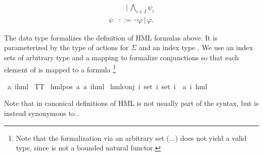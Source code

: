 \begin{isabellebody}
\begin{isamarkuptext}
\begin{align*}
            &\quad | \, \bigwedge_{i \in I} \psi_i \\
    \psi &::= \neg \varphi \, | \, \varphi.
\end{align*}%
\end{isamarkuptext}\isamarkuptrue%
%
\begin{isamarkuptext}%
The data type  formalizes the definition of HML formulas above. It is parameterized by the type of actions  for $\Sigma$
and an index type . We use an index sets of arbitrary type  and a mapping  to formalize
conjunctions so that each element of  is mapped to a formula%
\footnote{Note that the formalization via an arbitrary set (...) does not yield a valid type, since  is not a bounded natural functor.}%
\end{isamarkuptext}\isamarkuptrue%
\isamarkupfalse%
\ {\isacharparenleft}{\kern0pt}{\isacharprime}{\kern0pt}a{\isacharcomma}{\kern0pt}\ {\isacharprime}{\kern0pt}i{\isacharparenright}{\kern0pt}hml\ {\isacharequal}{\kern0pt}\isanewline
TT\ {\isacharbar}{\kern0pt}\isanewline
hml{\isacharunderscore}{\kern0pt}pos\ {\isacartoucheopen}{\isacharprime}{\kern0pt}a{\isacartoucheclose}\ {\isacartoucheopen}{\isacharparenleft}{\kern0pt}{\isacharprime}{\kern0pt}a{\isacharcomma}{\kern0pt}\ {\isacharprime}{\kern0pt}i{\isacharparenright}{\kern0pt}hml{\isacartoucheclose}\ {\isacharbar}{\kern0pt}\isanewline
hml{\isacharunderscore}{\kern0pt}conj\ {\isachardoublequoteopen}{\isacharprime}{\kern0pt}i\ set{\isachardoublequoteclose}\ {\isachardoublequoteopen}{\isacharprime}{\kern0pt}i\ set{\isachardoublequoteclose}\ {\isachardoublequoteopen}{\isacharprime}{\kern0pt}i\ {\isasymRightarrow}\ {\isacharparenleft}{\kern0pt}{\isacharprime}{\kern0pt}a{\isacharcomma}{\kern0pt}\ {\isacharprime}{\kern0pt}i{\isacharparenright}{\kern0pt}\ hml{\isachardoublequoteclose}%
\begin{isamarkuptext}%
Note that in canonical definitions of HML  is not usually part of the syntax,
but is instead synonymous to \isa{{\isasymAnd}{\isacharbraceleft}{\kern0pt}{\isacharbraceright}{\kern0pt}}.

\end{isamarkuptext}
\end{isabellebody}
